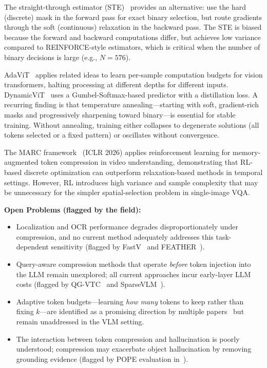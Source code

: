 \documentclass[11pt,twocolumn]{article}
\begin{document}
The straight-through estimator (STE)~\cite{bengio2013estimating} provides an alternative: use the hard (discrete) mask in the forward pass for exact binary selection, but route gradients through the soft (continuous) relaxation in the backward pass. The STE is biased because the forward and backward computations differ, but achieves low variance compared to REINFORCE-style estimators, which is critical when the number of binary decisions is large (e.g., $N = 576$).

AdaViT~\cite{meng2022adavit} applies related ideas to learn per-sample computation budgets for vision transformers, halting processing at different depths for different inputs. DynamicViT~\cite{rao2021dynamicvit} uses a Gumbel-Softmax-based predictor with a distillation loss. A recurring finding is that temperature annealing---starting with soft, gradient-rich masks and progressively sharpening toward binary---is essential for stable training. Without annealing, training either collapses to degenerate solutions (all tokens selected or a fixed pattern) or oscillates without convergence.

The MARC framework~\cite{wang2026marc} (ICLR 2026) applies reinforcement learning for memory-augmented token compression in video understanding, demonstrating that RL-based discrete optimization can outperform relaxation-based methods in temporal settings. However, RL introduces high variance and sample complexity that may be unnecessary for the simpler spatial-selection problem in single-image VQA.

\bigskip

\textbf{Open Problems (flagged by the field):}
\begin{itemize}[leftmargin=*, itemsep=2pt]
    \item Localization and OCR performance degrades disproportionately under compression, and no current method adequately addresses this task-dependent sensitivity (flagged by FastV~\cite{chen2024fastv} and FEATHER~\cite{endo2025feather}).
    \item Query-aware compression methods that operate \emph{before} token injection into the LLM remain unexplored; all current approaches incur early-layer LLM costs (flagged by QG-VTC~\cite{li2025qgvtc} and SparseVLM~\cite{zhang2025sparsevlm}).
    \item Adaptive token budgets---learning \emph{how many} tokens to keep rather than fixing $k$---are identified as a promising direction by multiple papers~\cite{meng2022adavit, chen2024fastv} but remain unaddressed in the VLM setting.
    \item The interaction between token compression and hallucination is poorly understood; compression may exacerbate object hallucination by removing grounding evidence (flagged by POPE evaluation in~\cite{shang2024llava}).
\end{itemize}
\end{document}
